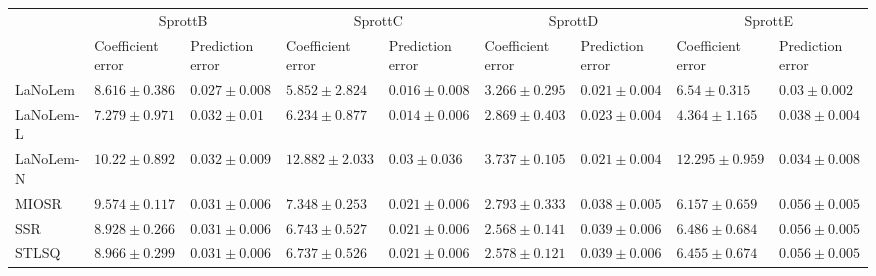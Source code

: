 \begin{table*}
{\begin{tabular}{lllllllll}
 & \multicolumn{2}{c}{SprottB} & \multicolumn{2}{c}{SprottC} & \multicolumn{2}{c}{SprottD} & \multicolumn{2}{c}{SprottE} \\
 & Coefficient error & Prediction error & Coefficient error & Prediction error & Coefficient error & Prediction error & Coefficient error & Prediction error \\
\midrule
LaNoLem & $8.616\pm 0.386$ & $\mathbf{0.027}\pm 0.008$ & $\mathbf{5.852}\pm 2.824$ & $0.016\pm 0.008$ & $3.266\pm 0.295$ & $0.021\pm 0.004$ & $6.54\pm 0.315$ & $\mathbf{0.03}\pm 0.002$ \\
LaNoLem-L & $\mathbf{7.279}\pm 0.971$ & $0.032\pm 0.01$ & $6.234\pm 0.877$ & $\mathbf{0.014}\pm 0.006$ & $2.869\pm 0.403$ & $0.023\pm 0.004$ & $\mathbf{4.364}\pm 1.165$ & $0.038\pm 0.004$ \\
LaNoLem-N & $10.22\pm 0.892$ & $0.032\pm 0.009$ & $12.882\pm 2.033$ & $0.03\pm 0.036$ & $3.737\pm 0.105$ & $\mathbf{0.021}\pm 0.004$ & $12.295\pm 0.959$ & $0.034\pm 0.008$ \\
MIOSR & $9.574\pm 0.117$ & $0.031\pm 0.006$ & $7.348\pm 0.253$ & $0.021\pm 0.006$ & $2.793\pm 0.333$ & $0.038\pm 0.005$ & $6.157\pm 0.659$ & $0.056\pm 0.005$ \\
SSR & $8.928\pm 0.266$ & $0.031\pm 0.006$ & $6.743\pm 0.527$ & $0.021\pm 0.006$ & $\mathbf{2.568}\pm 0.141$ & $0.039\pm 0.006$ & $6.486\pm 0.684$ & $0.056\pm 0.005$ \\
STLSQ & $8.966\pm 0.299$ & $0.031\pm 0.006$ & $6.737\pm 0.526$ & $0.021\pm 0.006$ & $2.578\pm 0.121$ & $0.039\pm 0.006$ & $6.455\pm 0.674$ & $0.056\pm 0.005$ \\

\midrule


\end{tabular}}
\end{table*}
